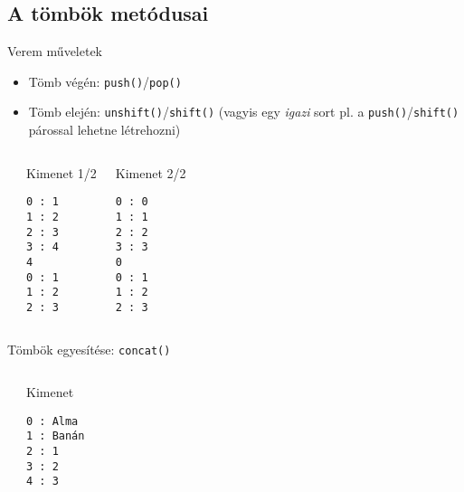\subsection{A tömbök metódusai}

\begin{frame}[fragile]
  \small
  Verem műveletek
  \begin{itemize}
    \item Tömb végén: \texttt{push()}/\texttt{pop()}
    \item Tömb elején: \texttt{unshift()}/\texttt{shift()} (vagyis egy \emph{igazi} sort pl. a \texttt{push()}/\texttt{shift()} párossal lehetne létrehozni)
  \end{itemize}
  \scriptsize
  \begin{columns}[T]
      \begin{exampleblock}{}
        
      \end{exampleblock}
      \begin{block}{Kimenet 1/2}
        \begin{verbatim}
0 : 1
1 : 2
2 : 3
3 : 4
4
0 : 1
1 : 2
2 : 3
\end{verbatim}
      \end{block}
      \begin{block}{Kimenet 2/2}
        \begin{verbatim}
0 : 0
1 : 1
2 : 2
3 : 3
0
0 : 1
1 : 2
2 : 3
\end{verbatim}
      \end{block}
  \end{columns}
\end{frame}

\begin{frame}[fragile]
  Tömbök egyesítése: \texttt{concat()}
  \vfill
  \small
  \begin{columns}[T]
      \begin{exampleblock}{}
        
      \end{exampleblock}
      \begin{block}{Kimenet}
        \begin{verbatim}
0 : Alma
1 : Banán
2 : 1
3 : 2
4 : 3
\end{verbatim}
      \end{block}
  \end{columns}
\end{frame}

